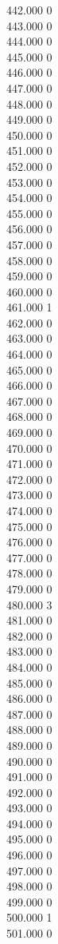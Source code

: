 { 442.000	0 \\
 443.000	0 \\
 444.000	0 \\
 445.000	0 \\
 446.000	0 \\
 447.000	0 \\
 448.000	0 \\
 449.000	0 \\
 450.000	0 \\
 451.000	0 \\
 452.000	0 \\
 453.000	0 \\
 454.000	0 \\
 455.000	0 \\
 456.000	0 \\
 457.000	0 \\
 458.000	0 \\
 459.000	0 \\
 460.000	0 \\
 461.000	1 \\
 462.000	0 \\
 463.000	0 \\
 464.000	0 \\
 465.000	0 \\
 466.000	0 \\
 467.000	0 \\
 468.000	0 \\
 469.000	0 \\
 470.000	0 \\
 471.000	0 \\
 472.000	0 \\
 473.000	0 \\
 474.000	0 \\
 475.000	0 \\
 476.000	0 \\
 477.000	0 \\
 478.000	0 \\
 479.000	0 \\
 480.000	3 \\
 481.000	0 \\
 482.000	0 \\
 483.000	0 \\
 484.000	0 \\
 485.000	0 \\
 486.000	0 \\
 487.000	0 \\
 488.000	0 \\
 489.000	0 \\
 490.000	0 \\
 491.000	0 \\
 492.000	0 \\
 493.000	0 \\
 494.000	0 \\
 495.000	0 \\
 496.000	0 \\
 497.000	0 \\
 498.000	0 \\
 499.000	0 \\
 500.000	1 \\
 501.000	0 \\
}
